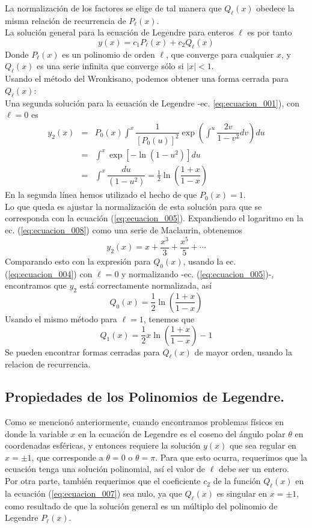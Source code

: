 La normalización de los factores se elige de tal manera que $Q_{\ell}(x)$ obedece la misma relación de recurrencia de $P_{\ell}(x)$.
\\
La solución general para la ecuación de Legendre para enteros $\ell$ es por tanto
\begin{equation}
y(x) = c_{1} P_{\ell}(x) + c_{2} Q_{\ell} (x) 
\label{eq:ecuacion_007}
\end{equation}
Donde $P_{\ell}(x)$ es un polinomio de orden $\ell$, que converge para cualquier $x$, y $Q_{\ell}(x)$ es una serie infinita que converge sólo si $\vert x \vert < 1$.
\\
Usando el método del Wronkisano, podemos obtener una forma cerrada para $Q_{\ell}(x)$:
\\
Una segunda solución para la ecuación de Legendre -ec. \ref{eq:ecuacion_001}), con $\ell = 0$ es
\begin{eqnarray}
y_{2}(x) &=& P_{0}(x) \int^{x} \dfrac{1}{[P_{0}(u)]^{2}} \exp \left( \int^{u} \dfrac{2v}{1-v^{2}} dv \right) du \nonumber \\
&=& \int^{x} \exp [ - \ln (1 - u^{2}) ] du \nonumber \\
&=& \int^{x} \dfrac{du}{(1-u^{2})} = \frac{1}{2} \ln \left( \dfrac{1+x}{1-x} \right) \label{eq:ecuacion_008}
\end{eqnarray}
En la segunda línea hemos utilizado el hecho de que $P_{0}(x)=1$.
\\
Lo que queda es ajustar la normalización de esta solución para que se corresponda con la ecuación (\ref{eq:ecuacion_005}). Expandiendo el logaritmo en la ec. (\ref{eq:ecuacion_008}) como una serie de Maclaurin, obtenemos
\[ y_{2}(x) = x + \dfrac{x^{3}}{3} + \dfrac{x^{5}}{5} + \cdots \]
Comparando esto con la expresión para $Q_{0}(x)$, usando la ec. (\ref{eq:ecuacion_004}) con $\ell = 0$ y normalizando -ec. (\ref{eq:ecuacion_005})-, encontramos que $y_{2}$ está correctamente normalizada, así
\[ Q_{0} (x) = \dfrac{1}{2} \ln \left( \dfrac{1+x}{1-x} \right) \]
Usando el mismo método para $\ell = 1$, tenemos que
\[ Q_{1} (x) =  \frac{1}{2} x \ln \left( \dfrac{1+x}{1-x} \right) - 1 \]
Se pueden encontrar formas cerradas para $Q_{\ell}(x)$ de mayor orden, usando la relacion de recurrencia.
\subsection{Propiedades de los Polinomios de Legendre.}
Como se mencionó anteriormente, cuando encontramos problemas físicos en donde la variable $x$ en la ecuación de Legendre es el coseno del ángulo polar $\theta$ en coordenadas esféricas, y entonces requiere la solución $y(x)$ que sea regular en $x = \pm 1$, que corresponde a $\theta = 0$ o $\theta = \pi$. Para que esto ocurra, requerimos que la ecuación tenga una solución polinomial, así el valor de $\ell$ debe ser un entero.
\\
Por otra parte, también requerimos que el coeficiente $c_{2}$ de la función $Q_{\ell}(x)$ en la ecuación (\ref{eq:ecuacion_007}) sea nulo, ya que $Q_{\ell}(x)$ es singular en $x = \pm 1$, como resultado de que la solución general es un múltiplo del polinomio de Legendre $P_{\ell}(x)$.
